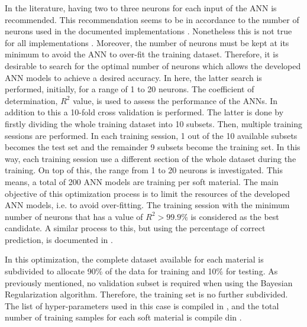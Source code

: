 In the literature, having two to three neurons for each input of the ANN is recommended. This recommendation seems to be in accordance to the number of neurons used in the documented implementations \cite{rodriguez2019application,kopal2018prediction,jenik2017sequential}. Nonetheless this is not true for all implementations \cite{yousef2011prediction,kopal2017modeling}. Moreover, the number of neurons must be kept at its minimum to avoid the ANN to over-fit the training dataset. Therefore, it is desirable to search for the optimal number of neurons which allows the developed ANN models to achieve a desired accuracy. In here, the latter search is performed, initially, for a range of 1 to 20 neurons. The coefficient of determination, $R^2$ value, is used to assess the performance of the ANNs. In addition to this a 10-fold cross validation is performed. The latter is done by firstly dividing the whole training dataset into 10 subsets. Then, multiple training sessions are performed. In each training session, 1 out of the 10 available subsets becomes the test set and the remainder 9 subsets become the training set. In this way, each training session use a different section of the whole dataset during the training. On top of this, the range from 1 to 20 neurons is investigated. This means, a total of 200 ANN models are training per soft material. The main objective of this optimization process is to limit the resources of the developed ANN models, i.e. to avoid over-fitting. The training session with the minimum number of neurons that has a value of $R^2>99.9\%$ is considered as the best candidate. A similar process to this, but using the percentage of correct prediction, is documented in \cite{zhang2002dynamic}.

In this optimization, the complete dataset available for each material is subdivided to allocate 90\% of the data for training and 10\% for testing. As previously mentioned, no validation subset is required when using the Bayesian Regularization algorithm. Therefore, the training set is no further subdivided. The list of hyper-parameters used in this case is compiled in , and the total number of training samples for each soft material is compile din .

